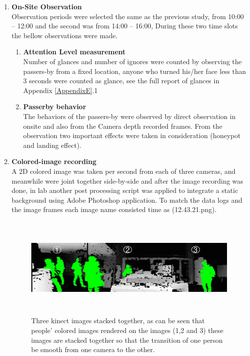 \begin{enumerate}
\item \textbf{On-Site Observation} \\
Observation periods were selected the same as the previous study, from 10:00 – 12:00 and the second was from 14:00 – 16:00, During these two time slots the bellow observations were made.

\begin{enumerate}
\item \textbf{Attention Level measurement} \\
Number of glances and number of ignores were counted by observing the passers-by from a fixed location, anyone who turned his/her face less than 3 seconds were counted as glance, see the full report of glances in Appendix \ref{AppendixE}.1

\item \textbf{Passerby behavior} \\
The behaviors of the passers-by were observed by direct observation in onsite and also from the Camera depth recorded frames. From the observation two important effects were taken in consideration (honeypot and landing effect).


\end{enumerate}

\item \textbf{Colored-image recording} \\
A 2D colored image was taken per second from each of three cameras, and meanwhile were joint together side-by-side and after the image recording was done, in lab another post processing script was applied to integrate a static background using Adobe Photoshop application. To match the data logs and the image frames each image name consisted time as (12.43.21.png).

\begin{figure}[H]
   \centering
    \includegraphics[width=\textwidth,height=50mm]{Figures/9/stacked_image}%
    \caption{Three kinect images stacked together, as can be seen that people' colored images rendered on the images (1,2 and 3) these images are stacked together so that the transition of one person be smooth from one camera to the other. }%
    \label{fig:threekinectimages}%
\end{figure}

\end{enumerate}


